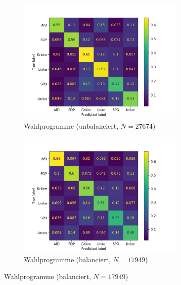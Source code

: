 \begin{figure}[H]
    \begin{subfigure}{0.5\textwidth}
      \centering
      \includegraphics[width=0.9\textwidth]{data/images/modeling/fasttext/none/party_programs_confusion_matrix.png}
      \caption{Wahlprogramme (unbalanciert, \(N = \num{27674}\))} \label{sfig:confusionMatrixFastTextManifest}
    \end{subfigure}
    \begin{subfigure}{0.5\textwidth}
      \centering
      \includegraphics[width=0.9\textwidth]{data/images/modeling/fasttext/under/party_programs_confusion_matrix.png}
      \caption{Wahlprogramme (balanciert, \(N = \num{17949}\))} \label{sfig:confusionMatrixFastTextManifestBalanced}
    \end{subfigure}
    

\end{figure}

